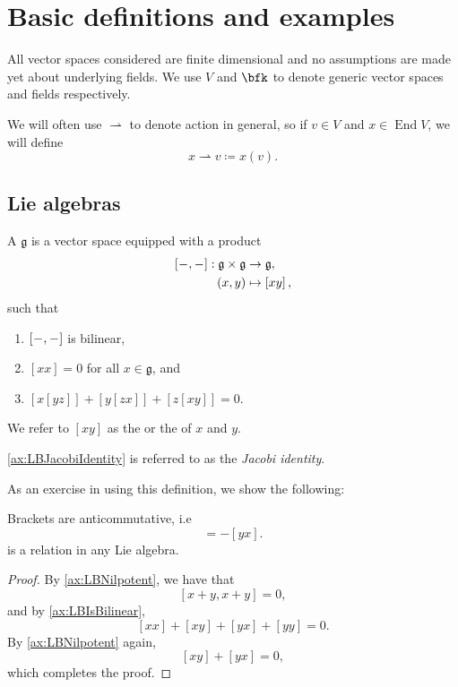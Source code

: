 \documentclass{article}
\newcommand*\wc{{\mkern 0.5mu-\mkern 0.5mu}}
\newcommand{\lb}[1]{\ensuremath{\left[{#1}\right]}}
\DeclareMathOperator{\End}{End}
\newcommand*\frkg{{\ensuremath{\mathfrak{g}}}}
\begin{document}
\newpage

\section{Basic definitions and examples}

\begin{convention}
    All vector spaces considered are finite dimensional and no assumptions are made yet about underlying fields.
    We use $V$ and $\bfk$ to denote generic vector spaces and fields respectively.

    We will often use $\rightharpoonup$ to denote action in general, so if $v \in V$ and $x \in \End V$, we will define
    \[
        x \rightharpoonup v
        \coloneq
        x(v).
    \]
\end{convention}

\subsection{Lie algebras}

\begin{definition}
    A  $\frkg$ is a vector space equipped with a product
    \begin{align*}
        \lb{\wc,\wc}: \frkg \times \frkg
        &\to
        \frkg,
        \\
        (x,y)
        &\mapsto
        \lb{xy},
    \end{align*}
    such that
    \begin{enumerate}[label=(L\arabic*)]
        \item 
            \label{ax:LBIsBilinear}
            $\lb{\wc,\wc}$ is bilinear,
        \item 
            \label{ax:LBNilpotent}
            $\lb{xx} = 0$ for all $x \in \frkg$, and
        \item 
            \label{ax:LBJacobiIdentity}
            $\lb{x\lb{yz}} + \lb{y\lb{zx}} + \lb{z\lb{xy}} = 0$.
    \end{enumerate}
    We refer to $\lb{xy}$ as the  or the  of $x$ and $y$.
\end{definition}

\ref{ax:LBJacobiIdentity} is referred to as the \textit{Jacobi identity}.

As an exercise in using this definition, we show the following:

\begin{proposition}
    Brackets are anticommutative, i.e
    \begin{equation}
        [xy]
        =
        -[yx].
        \tag{L2'}
    \end{equation}
    is a relation in any Lie algebra.
\end{proposition}
\begin{proof}
    By \ref{ax:LBNilpotent}, we have that
    \[
        \lb{x+y,x+y}
        =
        0,
    \]
    and by \ref{ax:LBIsBilinear},
    \[
        \lb{xx} + \lb{xy} + \lb{yx} + \lb{yy}
        =
        0.
    \]
    By \ref{ax:LBNilpotent} again,
    \[
        \lb{xy} + \lb{yx}
        =
        0,
    \]
    which completes the proof.
\end{proof}
\end{document}
